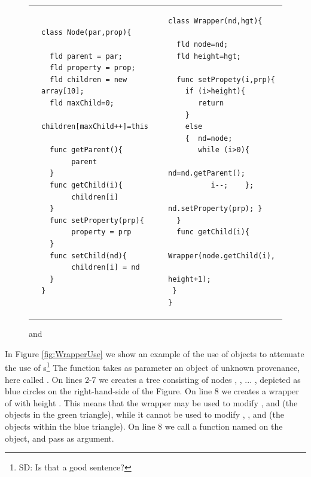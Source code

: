 \begin{figure}[htb]
\begin{tabular}{llll}
&
\begin{minipage}{0.45\textwidth}
\begin{lstlisting}
class Node(par,prop){

  fld parent = par;
  fld property = prop;
  fld children = new array[10];
  fld maxChild=0;
  children[maxChild++]=this
  
  func getParent(){
       parent 
  }  
  func getChild(i){
       children[i] 
  }
  func setProperty(prp){
       property = prp 
  }  
  func setChild(nd){
       children[i] = nd
  }  
}
\end{lstlisting}
\end{minipage}
& & 
\begin{minipage}{0.40\textwidth}
\begin{lstlisting}
class Wrapper(nd,hgt){

  fld node=nd;
  fld height=hgt;

  func setPropety(i,prp){
    if (i>height){ 
       return 
    } 
    else  
    {  nd=node;  
       while (i>0){
          nd=nd.getParent();
          i--;    };
        nd.setProperty(prp); }
  }    
  func getChild(i){ 
    Wrapper(node.getChild(i),
                    height+1); 
 }                           
}
\end{lstlisting}
\end{minipage}
\end{tabular}
 \vspace*{-7mm}
\caption{  and  }
\label{fig:DOM}
\end{figure}

In Figure \ref{fig:WrapperUse} we show an example of the use of   objects to attenuate the use of s\footnote{SD: Is that a good sentence?}  The function  takes as parameter an object of unknown provenance, here called . On lines 2-7 we creates a tree consisting of nodes , , ... , depicted as blue circles on the   right-hand-side of the Figure. On line 8 we creates a wrapper of  with height . This means that the wrapper  may be used to modify ,  and  (\ie the objects in the green triangle), while it cannot be used to modify , , and  (\ie the objects within the blue triangle). 
On line 8 we call a  function named  on the  object, and pass  as   argument. 

